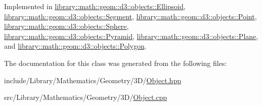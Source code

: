 Implemented in \hyperlink{classlibrary_1_1math_1_1geom_1_1d3_1_1objects_1_1_ellipsoid_a7ef605ac9ab20b5bd47ade8603ee6e09}{library\+::math\+::geom\+::d3\+::objects\+::\+Ellipsoid}, \hyperlink{classlibrary_1_1math_1_1geom_1_1d3_1_1objects_1_1_segment_a9a6b09a627c59fd2f2f3bd01a5afea22}{library\+::math\+::geom\+::d3\+::objects\+::\+Segment}, \hyperlink{classlibrary_1_1math_1_1geom_1_1d3_1_1objects_1_1_point_a7525be2cff259addc949a3aa05a715c7}{library\+::math\+::geom\+::d3\+::objects\+::\+Point}, \hyperlink{classlibrary_1_1math_1_1geom_1_1d3_1_1objects_1_1_sphere_af2a22ab0dc9331bddf358a9c24f8e7cf}{library\+::math\+::geom\+::d3\+::objects\+::\+Sphere}, \hyperlink{classlibrary_1_1math_1_1geom_1_1d3_1_1objects_1_1_pyramid_a8a8514a9db12bea021014ce38a6db3b5}{library\+::math\+::geom\+::d3\+::objects\+::\+Pyramid}, \hyperlink{classlibrary_1_1math_1_1geom_1_1d3_1_1objects_1_1_plane_a58e3829c1a2f96a571eebe0996850984}{library\+::math\+::geom\+::d3\+::objects\+::\+Plane}, and \hyperlink{classlibrary_1_1math_1_1geom_1_1d3_1_1objects_1_1_polygon_aa0c2e161c936e39addcd783237d68090}{library\+::math\+::geom\+::d3\+::objects\+::\+Polygon}.



The documentation for this class was generated from the following files\+:\begin{DoxyCompactItemize}
\item 
include/\+Library/\+Mathematics/\+Geometry/3\+D/\hyperlink{3_d_2_object_8hpp}{Object.\+hpp}\item 
src/\+Library/\+Mathematics/\+Geometry/3\+D/\hyperlink{3_d_2_object_8cpp}{Object.\+cpp}\end{DoxyCompactItemize}
